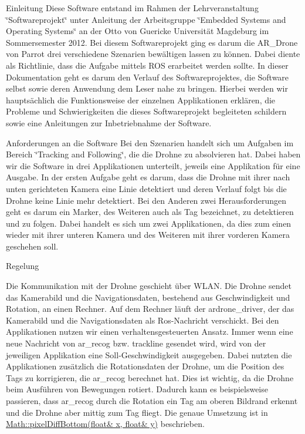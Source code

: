 

Einleitung Diese Software entstand im Rahmen der Lehrveranstaltung \char`\"{}Softwareprojekt\char`\"{} unter Anleitung der Arbeitsgruppe \char`\"{}Embedded Systems and Operating Systems\char`\"{} an der Otto von Guericke Universität Magdeburg im Sommersemester 2012. Bei diesem Softwareprojekt ging es darum die AR\_\-Drone von Parrot drei verschiedene Szenarien bewältigen lassen zu können. Dabei diente als Richtlinie, dass die Aufgabe mittels ROS erarbeitet werden sollte. In dieser Dokumentation geht es darum den Verlauf des Softwareprojektes, die Software selbst sowie deren Anwendung dem Leser nahe zu bringen. Hierbei werden wir hauptsächlich die Funktionsweise der einzelnen Applikationen erklären, die Probleme und Schwierigkeiten die dieses Softwareprojekt begleiteten schildern sowie eine Anleitungen zur Inbetriebnahme der Software.

Anforderungen an die Software Bei den Szenarien handelt sich um Aufgaben im Bereich \char`\"{}Tracking and Following\char`\"{}, die die Drohne zu absolvieren hat. Dabei haben wir die Software in drei Applikationen unterteilt, jeweils eine Applikation für eine Ausgabe. In der ersten Aufgabe geht es darum, dass die Drohne mit ihrer nach unten gerichteten Kamera eine Linie detektiert und deren Verlauf folgt bis die Drohne keine Linie mehr detektiert. Bei den Anderen zwei Herausforderungen geht es darum ein Marker, des Weiteren auch als Tag bezeichnet, zu detektieren und zu folgen. Dabei handelt es sich um zwei Applikationen, da dies zum einen wieder mit ihrer unteren Kamera und des Weiteren mit ihrer vorderen Kamera geschehen soll.



Regelung



Die Kommunikation mit der Drohne geschieht über WLAN. Die Drohne sendet das Kamerabild und die Navigationsdaten, bestehend aus Geschwindigkeit und Rotation, an einen Rechner. Auf dem Rechner läuft der ardrone\_\-driver, der das Kamerabild und die Navigationsdaten als Ros-\/Nachricht verschickt. Bei den Applikationen nutzen wir einen verhaltensgesteuerten Ansatz. Immer wenn eine neue Nachricht von ar\_\-recog bzw. trackline gesendet wird, wird von der jeweiligen Applikation eine Soll-\/Geschwindigkeit ausgegeben. Dabei nutzten die Applikationen zusätzlich die Rotationsdaten der Drohne, um die Position des Tags zu korrigieren, die ar\_\-recog berechnet hat. Dies ist wichtig, da die Drohne beim Ausführen von Bewegungen rotiert. Dadurch kann es beispielsweise passieren, dass ar\_\-recog durch die Rotation ein Tag am oberen Bildrand erkennt und die Drohne aber mittig zum Tag fliegt. Die genaue Umsetzung ist in \hyperlink{namespace_math_a25b9284eb485b732c952786b63343aaa}{Math::pixelDiffBottom(float\& x, float\& y)} beschrieben.

